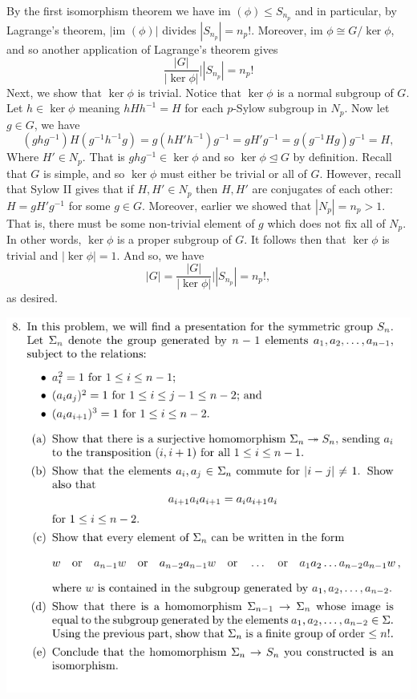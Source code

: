 \documentclass[12pt,letterpaper,boxed]{hmcpset}
\newcommand{\abs}[1]{\left|#1\right|}
\newcommand{\im}{\text{im }}
\newcommand{\inv}{^{-1}}
\newcommand{\normal}{\unlhd} %
\begin{document}
\begin{solution}
By the first isomorphism theorem we have $\im(\phi) \leq S_{n_p}$ and
in particular, by Lagrange's theorem, $\abs{\im(\phi)}$ divides
$\abs{S_{n_p}} = n_p!$. Moreover, $\im \phi \cong G / \ker \phi$, and
so another application of Lagrange's theorem gives \[
	\frac{\abs G}{\abs{\ker \phi}} \big\vert \abs{S_{n_p}} = n_p!
\]
Next, we show that $\ker \phi$ is trivial. Notice that $\ker \phi$ is
a normal subgroup of $G$. Let $h \in \ker \phi$ meaning $h H h\inv =
H$ for each $p$-Sylow subgroup in $N_p$. Now let $g \in G$, we have \[
	(g h g\inv) H (g\inv h\inv g) = g (h H' h\inv) g\inv
		= g H' g \inv = g (g\inv H g ) g\inv = H,
\]
Where $H' \in N_p$. 
That is $g h g\inv \in \ker \phi$ and so $\ker \phi \normal G$ by
definition. Recall that $G$ is simple, and so $\ker \phi$
must either be trivial or all of $G$. However, recall that Sylow II
gives that if $H, H' \in N_p$ then $H,H'$ are conjugates of each
other: $H = g H' g\inv$ for some $g \in G$. Moreover, earlier we
showed that $\abs{N_p} = n_p > 1$. That is, there must be some
non-trivial element of $g$ which does not fix all of $N_p$. In other
words, $\ker \phi$ is a proper subgroup of $G$. It follows then that
$\ker \phi$ is trivial and $\abs{\ker \phi} = 1$. And so, we have \[
\abs{G} = \frac{\abs G}{\abs{\ker \phi}} \big\vert \abs{S_{n_p}} =
n_p!,
\]
as desired.



\end{solution}

\newpage


\begin{problem}
	\includegraphics[scale=0.8]{8.png}
	\hfill
\end{problem}
\end{document}
